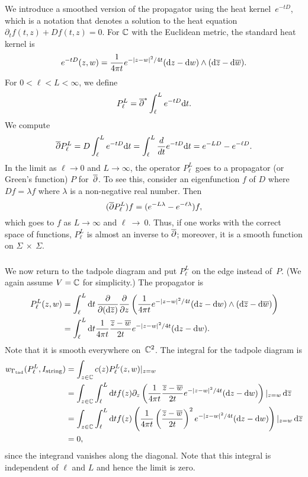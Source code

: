 We introduce a smoothed version of the propagator using the heat kernel~$e^{-tD}$,
which is a notation that denotes a solution to the heat equation $\partial_t f(t,z) + D f(t,z) = 0$.
For $\mathbb C$ with the Euclidean metric, the standard heat kernel is
\[
e^{-tD}(z,w) =  \frac{1}{4\pi t} e^{-|z-w|^2/4t} ({\rm d} z - {\rm d} w) \wedge ({\rm d}\overline{z} - {\rm d}\overline{w}) . 
\]
For $0 < \ell < L < \infty$, we define
\[
P_\ell^L = \overline{\partial}^* \int_{\ell}^L e^{-tD}{\rm d} t.
\]
We compute
\[
\overline{\partial} P_\ell^L = D \int_{\ell}^L e^{-tD}{\rm d} t =  \int_{\ell}^L \frac{d}{dt} e^{-tD}{\rm d} t = e^{-LD} - e^{-\ell D}.
\]
In the limit as $\ell \to 0$ and $L \to \infty$, the operator $P_\ell^L$ goes to a propagator (or Green's function) $P$ for~$\overline{\partial}$.
To see this, consider an eigenfunction $f$ of $D$ where $Df=\lambda f$ where $\lambda$ is a non-negative real number. 
Then
\[
(\overline{\partial} P_\ell^L) f = (e^{-L\lambda} - e^{-\ell \lambda})f, 
\]
which goes to $f$ as $L \to \infty$ and $\ell~\to~0$.
Thus, if one works with the correct space of functions, 
$P_\ell^L$ is almost an inverse to $\overline{\partial}$;
moreover, it is a smooth function on $\Sigma~\times~\Sigma$. 


\subsubsection{}

We now return to the tadpole diagram and put $P_\ell^L$ on the edge instead of~$P$.
(We again assume $V = \mathbb C$ for simplicity.)
The propagator is
\begin{align}\label{propagator}
P_\ell^L(z,w) &= \int_{\ell}^L {\rm d} t \, \frac{\partial}{\partial ({\rm d} \overline{z})} \frac{\partial}{\partial z}\left( \frac{1}{4\pi t} e^{-|z-w|^2/4t} ({\rm d} z - {\rm d} w) \wedge ({\rm d}\overline{z} - {\rm d}\overline{w})\right)\\
&= \int_{\ell}^L {\rm d} t \frac{1}{4\pi t} \frac{\overline{z} - \overline{w}}{2t} e^{-|z-w|^2/4t} ({\rm d} z - {\rm d} w).
\end{align}
Note that it is smooth everywhere on~$\mathbb C^2$.
The integral for the tadpole diagram is 
\begin{align*}
w_{\Gamma_{\rm tad}}(P_\ell^L,I_{\rm string})
&= \int_{z \in \mathbb C} c(z)P_\ell^L(z,w)|_{z = w}  \\
&= \int_{z \in \mathbb C} \int_{\ell}^L {\rm d} t f(z) \partial_z \left(\frac{1}{4\pi t} \frac{\overline{z} - \overline{w}}{2t} e^{-|z-w|^2/4t} ({\rm d} z - {\rm d} w) \right)|_{z = w}\, {\rm d} \overline{z}\\
&= \int_{z \in \mathbb C} \int_{\ell}^L {\rm d} t f(z) \left(\frac{1}{4\pi t} \left(\frac{\overline{z} - \overline{w}}{2t}\right)^2 e^{-|z-w|^2/4t} ({\rm d} z - {\rm d} w) \right)|_{z = w}\, {\rm d} \overline{z}\\
&= 0,
\end{align*}
since the integrand vanishes along the diagonal.
Note that this integral is independent of $\ell$ and $L$ and hence the limit is zero.

